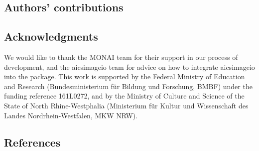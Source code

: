 \hypertarget{authors-contributions}{%
\subsection{Authors' contributions}\label{authors-contributions}}

\hypertarget{acknowledgments}{%
\subsection{Acknowledgments}\label{acknowledgments}}

We would like to thank the MONAI team for their support in our process of development, and the aicsimageio team for advice on how to integrate aicsimageio into the package. This work is supported by the Federal Ministry of Education and Research (Bundesministerium für Bildung und Forschung, BMBF) under the funding reference 161L0272, and by the Ministry of Culture and Science of the State of North Rhine-Westphalia (Ministerium für Kultur und Wissenschaft des Landes Nordrhein-Westfalen, MKW NRW).

\hypertarget{references}{%
\subsection{References}\label{references}}


